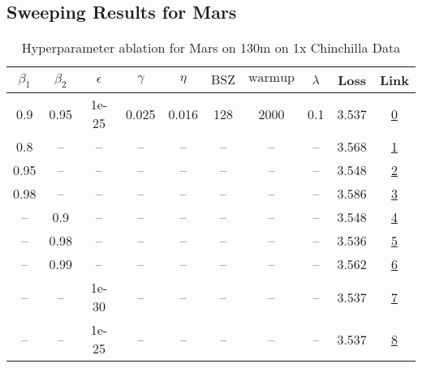 \subsection{Sweeping Results for Mars}%
\begin{table}[H]
\centering
\caption{Hyperparameter ablation for Mars on 130m on 1x Chinchilla Data}
\label{tab:ablation_mars_130m_1}
\begin{tabular}{cccccccccc}
\toprule
$\beta_1$ & $\beta_2$ & $\epsilon$ & $\gamma$ & $\eta$ & $\mathrm{BSZ}$ & $\mathrm{warmup}$ & $\lambda$ & Loss & Link \\
\midrule
0.9 & 0.95 & 1e-25 & 0.025 & 0.016 & 128 & 2000 & 0.1 & 3.537 & \href{https://wandb.ai/stanford-mercury/optimizer-scaling/runs/sweep-130m-2B-mars692316lr0.016-wd0.1-minlr0-warmup2000-b10.9-b2-93e276}{0} \\
\midrule
0.8 & -- & -- & -- & -- & -- & -- & -- & 3.568 & \href{https://wandb.ai/stanford-mercury/optimizer-scaling/runs/sweep-130m-2B-mars429f19lr0.016-wd0.1-minlr0-warmup2000-b10.8-b2-8e6b1f}{1} \\
0.95 & -- & -- & -- & -- & -- & -- & -- & 3.548 & \href{https://wandb.ai/stanford-mercury/optimizer-scaling/runs/sweep-130m-2B-mars07f867lr0.016-wd0.1-minlr0-warmup2000-b10.95-b-1c9da8}{2} \\
0.98 & -- & -- & -- & -- & -- & -- & -- & 3.586 & \href{https://wandb.ai/stanford-mercury/optimizer-scaling/runs/sweep-130m-2B-mars32fa0blr0.016-wd0.1-minlr0-warmup2000-b10.98-b-f2c1f5}{3} \\
-- & 0.9 & -- & -- & -- & -- & -- & -- & 3.548 & \href{https://wandb.ai/stanford-mercury/optimizer-scaling/runs/sweep-130m-2B-mars2816c1lr0.016-wd0.1-minlr0-warmup2000-b10.9-b2-ea14d0}{4} \\
-- & 0.98 & -- & -- & -- & -- & -- & -- & 3.536 & \href{https://wandb.ai/stanford-mercury/optimizer-scaling/runs/sweep-130m-2B-marse45e36lr0.016-wd0.1-minlr0-warmup2000-b10.9-b2-2de81b}{5} \\
-- & 0.99 & -- & -- & -- & -- & -- & -- & 3.562 & \href{https://wandb.ai/stanford-mercury/optimizer-scaling/runs/sweep-130m-2B-mars2f8911lr0.016-wd0.1-minlr0-warmup2000-b10.9-b2-172044}{6} \\
-- & -- & 1e-30 & -- & -- & -- & -- & -- & 3.537 & \href{https://wandb.ai/stanford-mercury/optimizer-scaling/runs/sweep-130m-2B-mars692316lr0.016-wd0.1-minlr0-warmup2000-b10.9-b2-93e276}{7} \\
-- & -- & 1e-25 & -- & -- & -- & -- & -- & 3.537 & \href{https://wandb.ai/stanford-mercury/optimizer-scaling/runs/sweep-130m-2B-mars692316lr0.016-wd0.1-minlr0-warmup2000-b10.9-b2-93e276}{8} \\

\end{tabular}
\end{table}
